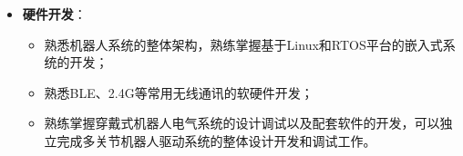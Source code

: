 \vspace{-6mm}
\begin{itemize}[leftmargin=*]
  \item \textbf{硬件开发}：
  {\small
  \begin{itemize}
    \item 熟悉机器人系统的整体架构，熟练掌握基于Linux和RTOS平台的嵌入式系统的开发；
    \item 熟悉BLE、2.4G等常用无线通讯的软硬件开发；
    \item 熟练掌握穿戴式机器人电气系统的设计调试以及配套软件的开发，可以独立完成多关节机器人驱动系统的整体设计开发和调试工作。
  \end{itemize}}
\end{itemize}

